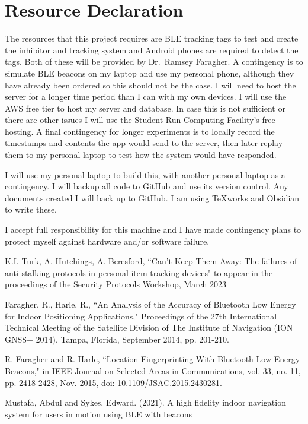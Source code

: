 \documentclass{article}
\begin{document}
\section{Resource Declaration}


The resources that this project requires are BLE tracking tags to test and create the inhibitor and tracking system and
Android phones are required to detect the tags.
Both of these will be provided by Dr.~Ramsey Faragher.
A contingency is to simulate BLE beacons on my laptop and use my personal phone, although they have already been ordered so this should not be the case.
I will need to host the server for a longer time period than I can with my own devices. I will use the AWS free tier to host my server and database. In case this is not sufficient or there are other issues I will use the Student-Run Computing Facility's free hosting. A final contingency for longer experiments is to locally record the timestamps and contents the app would send to the server, then later replay them to my personal laptop to test how the system would have responded.


I will use my personal laptop to build this, with another personal laptop as a contingency. I will backup all code to GitHub and use its version control. Any documents created I will back up to GitHub. I am using TeXworks and Obsidian to write these.


I accept full responsibility for this machine and I have made contingency plans to protect myself against hardware and/or software failure.


\begin{thebibliography}{9}
\frenchspacing
{} K.I. Turk, A. Hutchings, A. Beresford, ``Can’t Keep Them Away: The failures of anti-stalking protocols in personal item tracking devices" to appear in the proceedings of the Security Protocols Workshop, March 2023


 Faragher, R., Harle, R., ``An Analysis of the Accuracy of Bluetooth Low Energy for Indoor Positioning Applications," Proceedings of the 27th International Technical Meeting of the Satellite Division of The Institute of Navigation (ION GNSS+ 2014), Tampa, Florida, September 2014, pp. 201-210.


R. Faragher and R. Harle, ``Location Fingerprinting With Bluetooth Low Energy Beacons," in IEEE Journal on Selected Areas in Communications, vol. 33, no. 11, pp. 2418-2428, Nov. 2015, doi: 10.1109/JSAC.2015.2430281.


 Mustafa, Abdul and Sykes, Edward. (2021). A high fidelity indoor navigation system for users in motion using BLE with beacons
\end{thebibliography}
\end{document}
